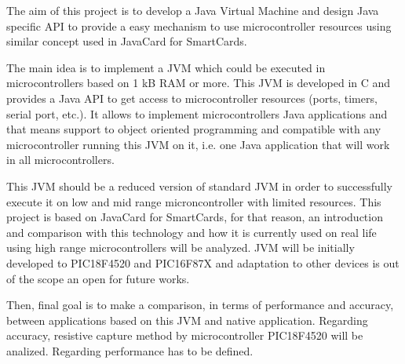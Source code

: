 \documentclass[english,final]{EETAC_TFC}
\begin{document}

\beforepreface  


\begin{overview}{11cm}
The aim of this project is to develop a Java Virtual Machine and design Java specific API to provide a easy mechanism to use microcontroller resources using similar concept used in JavaCard for SmartCards.

The main idea is to implement a JVM which could be executed in microcontrollers based on 1 kB RAM or more. This JVM is developed in C and provides a Java API to get access to microcontroller resources (ports, timers, serial port, etc.). It allows to implement microcontrollers Java applications and that means support to object oriented programming and compatible with any microcontroller running this JVM on it, i.e. one Java application that will work in all microcontrollers.

This JVM should be a reduced version of standard JVM in order to successfully execute it on low and mid range microncontroller with limited resources. This project is based on JavaCard for SmartCards, for that reason, an introduction and comparison with this technology and how it is currently used on real life using high range microcontrollers will be analyzed. JVM will be initially developed to PIC18F4520 and PIC16F87X and adaptation to other devices is out of the scope an open for future works.

Then, final goal is to make a comparison, in terms of performance and accuracy, between applications based on this JVM and native application. Regarding accuracy, resistive capture method by microcontroller PIC18F4520 will be analized. Regarding performance has to be defined.
\end{overview}


\end{document}

